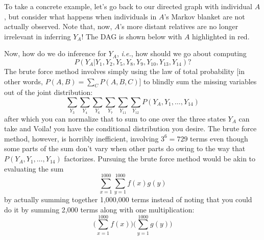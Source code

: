 \documentclass[11pt]{article}
\newcommand{\ie}{{\em i.e.},\xspace }
\begin{document}
To take a concrete example, let's go back to our directed graph with individual $A$, but consider
what happens when individuals in $A$'s Markov blanket are not actually observed.  Note that, now, 
$A$'s more distant relatives are no longer irrelevant in inferring $Y_A$!  The DAG is shown
below with $A$ highlighted in red.
\begin{center}
\end{center}
Now, how do we do inference for $Y_A$, \ie how should we go about computing
\[
P(Y_A|Y_1, Y_2, Y_5, Y_8, Y_9, Y_{10}, Y_{13}, Y_{14})?
\]
The brute force method involves simply using the law of total probability [in other words, $P(A,B) = \sum_{C} P(A,B,C)$] to blindly sum the missing variables out of the joint distribution:
\[
\sum_{Y_3}\sum_{Y_4}\sum_{Y_6}\sum_{Y_7}\sum_{Y_{11}}\sum_{Y_{12}} P(Y_A, Y_1,\ldots,Y_{14})
\]
after which you can normalize that to sum to one over the three states $Y_A$ can take and Voila! you
have the conditional distribution you desire.  The brute force method, however,
is horribly inefficient, involving $3^6 = 729$ terms even though some parts of the sum don't
vary when other parts do owing to the way that $P(Y_A, Y_1,\ldots,Y_{14})$ factorizes.
Pursuing the brute force method would be akin to evaluating the sum
\[
\sum_{x=1}^{1000} \sum_{y=1}^{1000} f(x) g(y)
\]
by actually summing together 1,000,000 terms instead of noting that you could do it
by summing 2,000 terms along with one multiplication:
\[
\biggl(\sum_{x=1}^{1000} f(x)\biggr)
\biggl(\sum_{y=1}^{1000} g(y)\biggr)
\]
\end{document}
